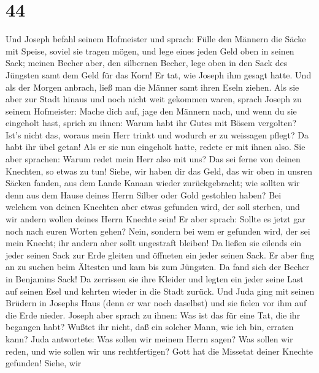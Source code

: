 \hypertarget{section-43}{%
\section{44}\label{section-43}}

 Und Joseph befahl seinem Hofmeister und sprach: Fülle den
Männern die Säcke mit Speise, soviel sie tragen mögen, und lege eines
jeden Geld oben in seinen Sack;  meinen Becher aber, den
silbernen Becher, lege oben in den Sack des Jüngsten samt dem Geld für
das Korn! Er tat, wie Joseph ihm gesagt hatte.  Und als
der Morgen anbrach, ließ man die Männer samt ihren Eseln ziehen.
 Als sie aber zur Stadt hinaus und noch nicht weit
gekommen waren, sprach Joseph zu seinem Hofmeister: Mache dich auf, jage
den Männern nach, und wenn du sie eingeholt hast, sprich zu ihnen: Warum
habt ihr Gutes mit Bösem vergolten?  Ist's nicht das,
woraus mein Herr trinkt und wodurch er zu weissagen pflegt? Da habt ihr
übel getan!  Als er sie nun eingeholt hatte, redete er mit
ihnen also.  Sie aber sprachen: Warum redet mein Herr also
mit uns? Das sei ferne von deinen Knechten, so etwas zu tun!
 Siehe, wir haben dir das Geld, das wir oben in unsren
Säcken fanden, aus dem Lande Kanaan wieder zurückgebracht; wie sollten
wir denn aus dem Hause deines Herrn Silber oder Gold gestohlen haben?
 Bei welchem von deinen Knechten aber etwas gefunden wird,
der soll sterben, und wir andern wollen deines Herrn Knechte sein!
 Er aber sprach: Sollte es jetzt gar noch nach euren
Worten gehen? Nein, sondern bei wem er gefunden wird, der sei mein
Knecht; ihr andern aber sollt ungestraft bleiben!  Da
ließen sie eilends ein jeder seinen Sack zur Erde gleiten und öffneten
ein jeder seinen Sack.  Er aber fing an zu suchen beim
Ältesten und kam bis zum Jüngsten. Da fand sich der Becher in Benjamins
Sack!  Da zerrissen sie ihre Kleider und legten ein jeder
seine Last auf seinen Esel und kehrten wieder in die Stadt zurück.
 Und Juda ging mit seinen Brüdern in Josephs Haus (denn
er war noch daselbst) und sie fielen vor ihm auf die Erde nieder.
 Joseph aber sprach zu ihnen: Was ist das für eine Tat,
die ihr begangen habt? Wußtet ihr nicht, daß ein solcher Mann, wie ich
bin, erraten kann?  Juda antwortete: Was sollen wir
meinem Herrn sagen? Was sollen wir reden, und wie sollen wir uns
rechtfertigen? Gott hat die Missetat deiner Knechte gefunden! Siehe, wir
